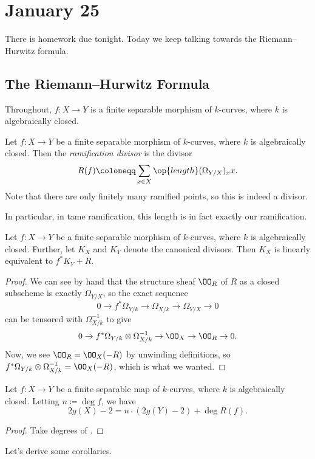 \documentclass[../notes.tex]{subfiles}
\begin{document}
\section{January 25}

There is homework due tonight. Today we keep talking towards the Riemann--Hurwitz formula.

\subsection{The Riemann--Hurwitz Formula}
Throughout, $f\colon X\to Y$ is a finite separable morphism of $k$-curves, where $k$ is algebraically closed.
\begin{definition}
	Let $f\colon X\to Y$ be a finite separable morphism of $k$-curves, where $k$ is algebraically closed. Then the \textit{ramification divisor} is the divisor
	\[R(f)\coloneqq\sum_{x\in X}\op{length}(\Omega_{Y/X})_xx.\]
	Note that there are only finitely many ramified points, so this is indeed a divisor.
\end{definition}
In particular, in tame ramification, this length is in fact exactly our ramification.
\begin{lemma} \label{lem:use-ramification}
	Let $f\colon X\to Y$ be a finite separable morphism of $k$-curves, where $k$ is algebraically closed. Further, let $K_X$ and $K_Y$ denote the canonical divisors. Then $K_X$ is linearly equivalent to $f^*K_Y+R$.
\end{lemma}
\begin{proof}
	We can see by hand that the structure sheaf $\OO_R$ of $R$ as a closed subscheme is exactly $\Omega_{Y/X}$, so the exact sequence
	\[0\to f^*\Omega_{Y/k}\to\Omega_{X/k}\to\Omega_{Y/X}\to0\]
	can be tensored with $\Omega_{X/k}^{-1}$ to give
	\[0\to f^*\Omega_{Y/k}\otimes\Omega_{X/k}^{-1}\to\OO_X\to\OO_R\to0.\]
	Now, we see $\OO_R=\OO_X(-R)$ by unwinding definitions, so $f^*\Omega_{Y/k}\otimes\Omega_{X/k}^{-1}=\OO_X(-R)$, which is what we wanted.
\end{proof}
\begin{theorem}[Hurwitz] \label{thm:rh}
	Let $f\colon X\to Y$ be a finite separable map of $k$-curves, where $k$ is algebraically closed. Letting $n\coloneqq\deg f$, we have
	\[2g(X)-2=n\cdot(2g(Y)-2)+\deg R(f).\]
\end{theorem}
\begin{proof}
	Take degrees of .
\end{proof}
Let's derive some corollaries.
\end{document}
